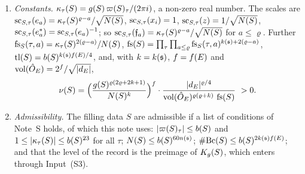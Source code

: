 \documentclass[11pt,a4paper]{article}
\theoremstyle{plainx}
\theoremstyle{uprightx}
\begin{document}
\begin{enumerate}[label=(R\arabic*),leftmargin=3.1em,itemsep=3pt]
first integral a value $\infty$ of the weight is read as $0$; by Lemma~\ref{l:sumone}(a) the weight is at most $1$.
\item\label{r:const} \emph{Constants.} $\kappa_{\tau}(S)=g(S)\,\varpi(S)_\tau/(2\pi i)$, a non-zero real number.
The scales are $\mathrm{sc}_{S,\tau}(e_a)=\kappa_{\tau}(S)^{\varrho-a}/\sqrt{N(S)}$, $\mathrm{sc}_{S,\tau}(x_i)=1$,
$\mathrm{sc}_{S,\tau}(z)=1/\sqrt{N(S)}$, $\mathrm{sc}_{S,\tau}(e^*_a)=\mathrm{sc}_{S,\tau}(e_a)^{-1}$; so
$\mathrm{sc}_{S,\tau}(\mathfrak{f}_{a})=\kappa_{\tau}(S)^{\varrho-a}/\sqrt{N(S)}$ for $a\le\varrho$. Further
$\mathrm{fs}_{S}(\tau,a)=\kappa_{\tau}(S)^{2(\varrho-a)}/N(S)$,
$\mathrm{fs}(S)=\prod_\tau\prod_{a\le\varrho}\mathrm{fs}_{S}(\tau,a)^{k(\mathfrak{s})+2(\varrho-a)}$, $\mathrm{tl}(S)=b(S)^{k(\mathfrak{s})f(E)/4}$, and,
with $k=k(\mathfrak{s})$, $f=f(E)$ and $\operatorname{vol}(\hat O_{E})=2^{f}/\sqrt{|d_E|}$,
\[\ucov{S}=\Bigl(\frac{\gS{S}^{\varrho(2\varrho+2k+1)}}{\NS{S}^{k}}\Bigr)^{f}\cdot\frac{|d_E|^{\varrho/4}}{\volO{E}^{\varrho(\varrho+k)}\ \fsprod{S}}\ >0.\]
\item\label{r:adm} \emph{Admissibility.} The filling data $S$ are admissible if a list of conditions of Note~S
holds, of which this note uses: $|\varpi(S)_\tau|\le b(S)$ and $1\le|\kappa_{\tau}(S)|\le b(S)^{23}$ for all $\tau$;
$N(S)\le b(S)^{60n(\mathfrak{s})}$; $\#\mathrm{Bc}(S)\le b(S)^{2k(\mathfrak{s})f(E)}$; and that the level of the record is the
preimage of $K_g(S)$, which enters through Input~(S3).
\end{enumerate}
\end{document}
